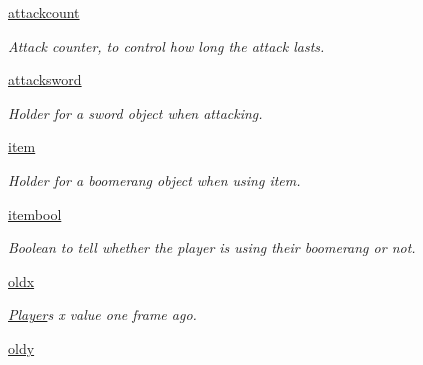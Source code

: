 \begin{DoxyCompactItemize}
\hyperlink{classactor_1_1player_1_1_player_a9014fc320d75f42a42067131ef359521}{attackcount}
\begin{DoxyCompactList}\small\item\em Attack counter, to control how long the attack lasts. \end{DoxyCompactList}\item 
\hyperlink{classactor_1_1player_1_1_player_a479ddb8958705d9cbd7830e9ba59f8c5}{attacksword}
\begin{DoxyCompactList}\small\item\em Holder for a sword object when attacking. \end{DoxyCompactList}\item 
\mbox{\label{classactor_1_1player_1_1_player_a6c97e5519cba645d52374ef46537b913}} 
\hyperlink{classactor_1_1player_1_1_player_a6c97e5519cba645d52374ef46537b913}{item}
\begin{DoxyCompactList}\small\item\em Holder for a boomerang object when using item. \end{DoxyCompactList}\item 
\mbox{\label{classactor_1_1player_1_1_player_ad03534ba44251c9d8d6b72d2b1cc027e}} 
\hyperlink{classactor_1_1player_1_1_player_ad03534ba44251c9d8d6b72d2b1cc027e}{itembool}
\begin{DoxyCompactList}\small\item\em Boolean to tell whether the player is using their boomerang or not. \end{DoxyCompactList}\item 
\mbox{\label{classactor_1_1player_1_1_player_a1dd72a6eb3f660ee7ae95848e534b5b4}} 
\hyperlink{classactor_1_1player_1_1_player_a1dd72a6eb3f660ee7ae95848e534b5b4}{oldx}
\begin{DoxyCompactList}\small\item\em \hyperlink{classactor_1_1player_1_1_player}{Player}\textquotesingle{}s x value one frame ago. \end{DoxyCompactList}\item 
\mbox{\label{classactor_1_1player_1_1_player_a732ab21f88b48cad06541e86e4f5166c}} 
\hyperlink{classactor_1_1player_1_1_player_a732ab21f88b48cad06541e86e4f5166c}{oldy}

\end{DoxyCompactItemize}
